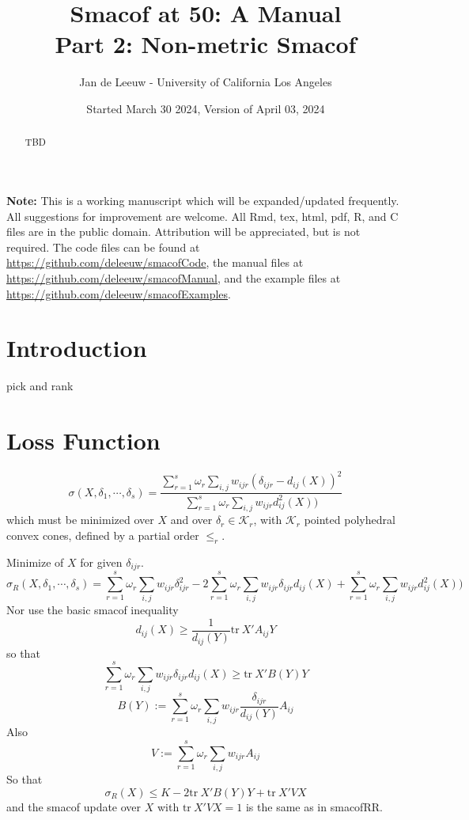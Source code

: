 \documentclass[
  12pt,
]{article}
\title{Smacof at 50: A Manual\\
Part 2: Non-metric Smacof}
\author{Jan de Leeuw - University of California Los Angeles}
\date{Started March 30 2024, Version of April 03, 2024}
\newcommand{\sectionbreak}{\clearpage}
\begin{document}
\maketitle
\begin{abstract}
TBD
\end{abstract}

{
\setcounter{tocdepth}{4}
\tableofcontents
}
\textbf{Note:} This is a working manuscript which will be expanded/updated
frequently. All suggestions for improvement are welcome. All Rmd, tex,
html, pdf, R, and C files are in the public domain. Attribution will be
appreciated, but is not required. The code files can be found at
\url{https://github.com/deleeuw/smacofCode}, the manual files at
\url{https://github.com/deleeuw/smacofManual}, and the example files
at \url{https://github.com/deleeuw/smacofExamples}.

\sectionbreak

\section{Introduction}\label{introduction}

pick and rank

\section{Loss Function}\label{loss-function}

\[
\sigma(X,\delta_1,\cdots,\delta_s)=\frac{\sum_{r=1}^s\omega_r\sum_{i,j} w_{ijr}(\delta_{ijr}-d_{ij}(X))^2}{\sum_{r=1}^s\omega_r\sum_{i,j} w_{ijr}d_{ij}^2(X))}
\]
which must be minimized over \(X\) and over \(\delta_r\in\mathcal{K}_r\), with \(\mathcal{K}_r\) pointed polyhedral convex cones, defined by a partial order
\(\leq_r\).

Minimize of \(X\) for given \(\delta_{ijr}\).
\[
\sigma_R(X,\delta_1,\cdots,\delta_s)=\sum_{r=1}^s\omega_r\sum_{i,j} w_{ijr}\delta_{ijr}^2-2\sum_{r=1}^s\omega_r\sum_{i,j} w_{ijr}\delta_{ijr}d_{ij}(X)+\sum_{r=1}^s\omega_r\sum_{i,j} w_{ijr}d_{ij}^2(X))
\]
Nor use the basic smacof inequality
\[
d_{ij}(X)\geq\frac{1}{d_{ij}(Y)}\text{tr}\ X'A_{ij}Y 
\]
so that
\[
\sum_{r=1}^s\omega_r\sum_{i,j} w_{ijr}\delta_{ijr}d_{ij}(X)\geq
\text{tr}\ X'B(Y)Y
\]
\[
B(Y):=\sum_{r=1}^s\omega_r\sum_{i,j} w_{ijr}\frac{\delta_{ijr}}{d_{ij}(Y)}A_{ij}
\]
Also
\[
V:=\sum_{r=1}^s\omega_r\sum_{i,j} w_{ijr}A_{ij}
\]
So that
\[
\sigma_R(X)\leq K-2\text{tr}\ X'B(Y)Y+\text{tr}\ X'VX
\]
and the smacof update over \(X\) with \(\text{tr}\ X'VX=1\) is the same
as in smacofRR.
\end{document}
